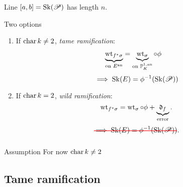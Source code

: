 \begin{frame}
\begin{figure}[ht]
    \centering
\end{figure}
Line $[a, b] = \operatorname{Sk}(\mathscr P)$ has length  $n$. 
\end{frame}
\begin{frame}{Two options}
	\begin{minipage}[t]{.48\textwidth}
		\begin{enumerate}
		\item If $\operatorname{char} k \ne 2$, \emph{tame ramification}: \begin{align*}
				\underbrace{\operatorname{wt}_{f^*\sigma}}_{\text{on }E{}^{\text{an}}} &= \underbrace{\operatorname{wt}_{\sigma}}_{\text{on }\mathbb P^{1, \text{an}}_K} \mathbin{\circ} \phi
			\end{align*}
			\pause
			\[
				\implies \operatorname{Sk}(E) = \phi^{-1}(\operatorname{Sk}(\mathscr P))
			\]
	\end{enumerate}
	\pause

	\end{minipage}
	\;
	\begin{minipage}[t]{.48\textwidth}
	\begin{enumerate}
		\setcounter{enumi}{1}
		\item If $\operatorname{char} k = 2$, \emph{wild ramification}:
			\[
				\operatorname{wt}_{f^* \sigma} = \operatorname{wt}_{\sigma} \circ \phi + \underbrace{\mathfrak{d} _f}_{\text{error}}
			.\] 
			\pause
			\[
				\redoutb{\text{$\implies \sk(E) = \phi^{-1}(\sk(\sP))$}}
			.\] 
	\end{enumerate}
	\end{minipage}
	\pause
	\medskip
	\begin{block}{Assumption}
		For now $\operatorname{char} k \ne 2$
	\end{block}

\end{frame}

\subsection{Tame ramification} \label{sec:tame_ramification}

